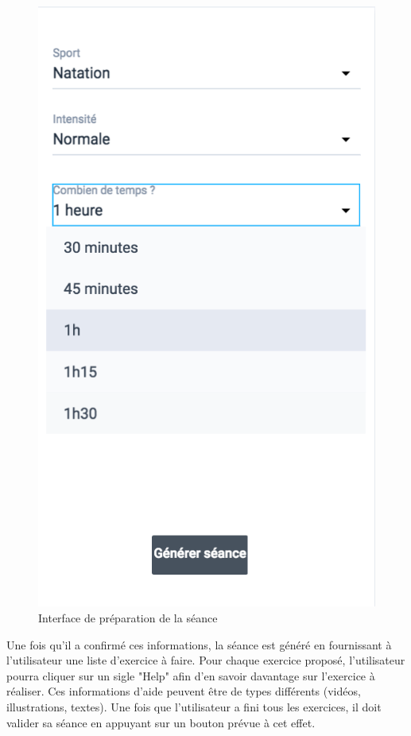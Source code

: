 \begin{figure}[!h]
\includegraphics[scale=0.3]{ihms/seance4}
\centering
\caption{Interface de préparation de la séance}
\end{figure}

Une fois qu'il a confirmé ces informations, la séance est généré en fournissant à l'utilisateur une liste d'exercice à faire. Pour chaque exercice proposé, l'utilisateur pourra cliquer sur un sigle "Help" afin d'en savoir davantage sur l'exercice à réaliser. Ces informations d'aide peuvent être de types différents (vidéos, illustrations, textes). Une fois que l'utilisateur a fini tous les exercices, il doit valider sa séance en appuyant sur un bouton prévue à cet effet.\\ 

